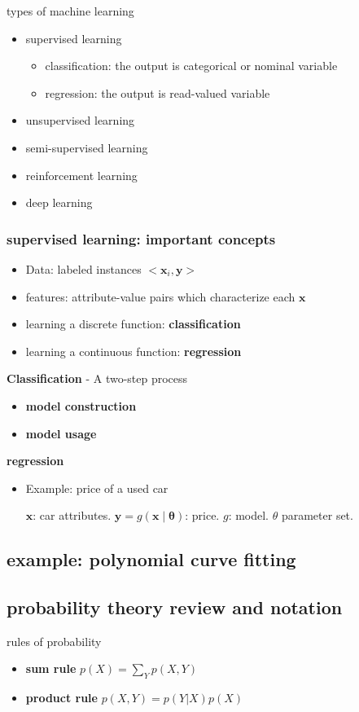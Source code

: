\documentclass[11pt]{article}
\newcommand{\bl}[1] {\boldsymbol{#1}}
\begin{document}
types of machine learning
\begin{itemize}
\item supervised learning
\begin{itemize}
\item classification: the output is categorical or nominal variable
\item regression: the output is read-valued variable
\end{itemize}
\item unsupervised learning
\item semi-supervised learning
\item reinforcement learning
\item deep learning
\end{itemize}
\subsubsection{supervised learning: important concepts}
\label{sec:org29b6e67}
\begin{itemize}
\item Data: labeled instances \(<\bl{x}_i,\bl{y}>\)
\item features: attribute-value pairs which characterize each \(\bl{x}\)
\item learning a discrete function: \textbf{classification}
\item learning a continuous function: \textbf{regression}
\end{itemize}

\textbf{Classification} - A two-step process
\begin{itemize}
\item \textbf{model construction}
\item \textbf{model usage}
\end{itemize}

\textbf{regression}
\begin{itemize}
\item Example: price of a used car

\(\bl{x}\): car attributes. \(\bl{y}=g(\bl{x}\mid\bl{\theta})\): price. \(g\):
model. \(\theta\) parameter set.
\end{itemize}
\subsection{example: polynomial curve fitting}
\label{sec:org7dce0da}
\subsection{probability theory review and notation}
\label{sec:orgde19897}
rules of probability
\begin{itemize}
\item \textbf{sum rule} \(p(X)=\displaystyle\sum_Yp(X,Y)\)
\item \textbf{product rule} \(p(X,Y)=p(Y|X)p(X)\)
\end{itemize}
\end{document}
